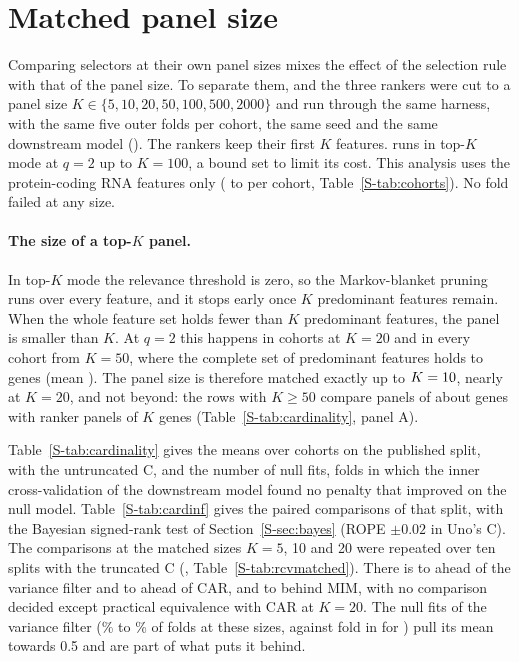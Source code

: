 \section{Matched panel size}\label{S-sec:cardinality}

Comparing selectors at their own panel sizes mixes the effect of the selection rule with
that of the panel size. To separate them,  and the three rankers were cut
to a panel size $K \in \{5, 10, 20, 50, 100, 500, 2000\}$ and run through the same
harness, with the same
five outer folds per cohort, the same seed and the same downstream model
(). The rankers keep their first $K$ features. 
runs in top-$K$ mode at $q = 2$ up to $K = 100$, a bound set to limit its cost. This
analysis uses the protein-coding RNA features only (\SuppCodingMin{} to \SuppCodingMax{}
per cohort, Table~\ref{S-tab:cohorts}). No fold failed at any size.

\paragraph{The size of a top-$K$ panel.} In top-$K$ mode the relevance threshold is zero,
so the Markov-blanket pruning runs over every feature, and it stops early once $K$
predominant features remain. When the whole feature set holds fewer than $K$ predominant
features, the panel is smaller than $K$. At $q = 2$ this happens in
\SuppCardShortTwenty{} cohorts at $K = 20$ and in every cohort from $K = 50$, where the
complete set of predominant features holds \SuppCardPanelMin{} to \SuppCardPanelMax{}
genes (mean \SuppCardPanelMean). The panel size is therefore matched exactly up to
$K = 10$, nearly at $K = 20$, and not beyond: the rows with $K \ge 50$
compare panels of about \SuppCardPanelMean{} genes with ranker panels of $K$ genes
(Table~\ref{S-tab:cardinality}, panel A).

Table~\ref{S-tab:cardinality} gives the means over cohorts on the published split, with
the untruncated C, and the number of null fits, folds in which the inner cross-validation
of the downstream model found no penalty that improved on the null model.
Table~\ref{S-tab:cardinf} gives the paired comparisons of that split, with the Bayesian
signed-rank test of Section~\ref{S-sec:bayes} (ROPE $\pm 0.02$ in Uno's C). The comparisons
at the matched sizes $K = 5$, 10 and 20 were repeated over ten splits with the truncated C
(, Table~\ref{S-tab:rcvmatched}). There  is
\SuppRcvVarLo{} to \SuppRcvVarHi{} ahead of the variance filter and \SuppRcvCarLo{} to
\SuppRcvCarHi{} ahead of CAR, and \SuppRcvMimLo{} to \SuppRcvMimHi{} behind MIM, with no
comparison decided except practical equivalence with CAR at $K = 20$. The null fits of the
variance filter (\SuppRcvNullVarLo\% to \SuppRcvNullVarHi\% of folds at these sizes,
against \SuppRcvNullTopk{} fold in \SuppRcvNullTopkFolds{} for ) pull its mean
towards 0.5 and are part of what puts it behind.

